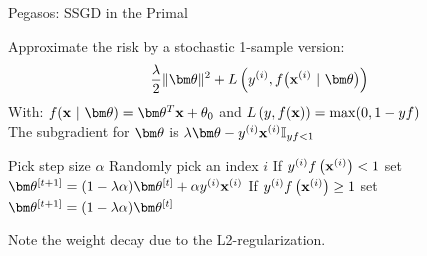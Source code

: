 \documentclass[11pt,compress,t,notes=noshow, xcolor=table]{beamer}
\begin{document}






\begin{vbframe}{Pegasos: SSGD in the Primal}

Approximate the risk by a stochastic 1-sample version: 
\vspace{-0.3cm}
$$ \frac{\lambda}{2} \|\thetav\|^2 + \Lxyit $$
With: $\fxt = \thetav^T \xv + \theta_0$ and $L\left(y, f(\mathbf{x})\right) = \max(0, 1 -  y f)$\\
The subgradient for $\thetav$ is $\lambda \thetav - \yi \xi \I_{yf < 1}$

\vspace{-0.1cm}

\begin{algorithm}[H]
  \caption*{Stochastic subgradient descent (without intercept $\theta_0$)}
  \begin{algorithmic}[1]
      \State Pick step size $\alpha$
      \State Randomly pick an index $i$
      \State If $y^{(i)} f\left(\mathbf{x}^{(i)}\right) < 1$ set $\thetatn = (1 - \lambda \alpha) \thetat + \alpha \yi \xi$ 
      \State If $y^{(i)} f\left(\mathbf{x}^{(i)}\right) \geq 1$ set $\thetatn = (1 - \lambda \alpha) \thetat$ 
      \EndFor
  \end{algorithmic}
\end{algorithm}
\vspace{-0.2cm}
Note the weight decay due to the L2-regularization.
\end{vbframe}
\end{document}

